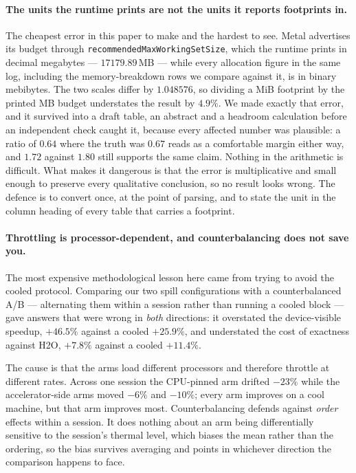 \documentclass[manuscript,anonymous,review]{acmart}
\begin{document}
\paragraph{The units the runtime prints are not the units it reports
footprints in.} The cheapest error in this paper to make and the
hardest to see. Metal advertises its budget through
\texttt{recommendedMaxWorkingSetSize}, which the runtime prints in
decimal megabytes --- $17179.89$\,MB --- while every allocation figure
in the same log, including the memory-breakdown rows we compare against
it, is in binary mebibytes. The two scales differ by $1.048576$, so
dividing a MiB footprint by the printed MB budget understates the
result by $4.9\%$. We made exactly that error, and it survived into a
draft table, an abstract and a headroom calculation before an
independent check caught it, because every affected number was
plausible: a ratio of $0.64$ where the truth was $0.67$ reads as a
comfortable margin either way, and $1.72$ against $1.80$ still supports
the same claim. Nothing in the arithmetic is difficult. What makes it
dangerous is that the error is multiplicative and small enough to
preserve every qualitative conclusion, so no result looks wrong. The
defence is to convert once, at the point of parsing, and to state the
unit in the column heading of every table that carries a footprint.

\paragraph{Throttling is processor-dependent, and counterbalancing does
not save you.} The most expensive methodological lesson here came from
trying to avoid the cooled protocol. Comparing our two spill
configurations with a counterbalanced A/B --- alternating them within a
session rather than running a cooled block --- gave answers that were
wrong in \emph{both} directions: it overstated the device-visible
speedup, $+46.5\%$ against a cooled $+25.9\%$, and understated the cost
of exactness against H2O, $+7.8\%$ against a cooled $+11.4\%$.

The cause is that the arms load different processors and therefore
throttle at different rates. Across one session the CPU-pinned arm
drifted $-23\%$ while the accelerator-side arms moved $-6\%$ and
$-10\%$; every arm improves on a cool machine, but that arm improves
most. Counterbalancing defends against \emph{order} effects within a
session. It does nothing about an arm being differentially sensitive to
the session's thermal level, which biases the mean rather than the
ordering, so the bias survives averaging and points in whichever
direction the comparison happens to face.
\end{document}
